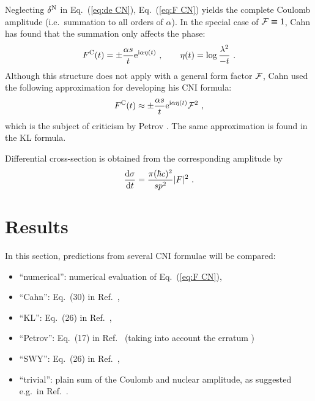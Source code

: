 \documentclass[pdftex,twocolumn,epjc3]{svjour3}
\def\d{{\rm d}}
\def\e{{\rm e}}
\def\I{{\rm i}}
\begin{document}
Neglecting $\delta^{\rm N}$ in Eq.~(\ref{eq:de CN}), Eq.~(\ref{eq:F CN}) yields the complete Coulomb amplitude (i.e.~summation to all orders of $\alpha$). In the special case of ${\cal F} \equiv 1$, Cahn has found that the summation only affects the phase:
\begin{equation}
F^{\rm C}(t) = \pm {\alpha s\over t} \e^{\I\alpha \eta(t)}\ ,\qquad \eta(t) = \log {\lambda^2\over -t}\ .
\label{eq:F C comp}
\end{equation}
Although this structure does not apply with a general form factor ${\cal F}$, Cahn used the following approximation for developing his CNI formula:
\begin{equation}
F^{\rm C}(t) \approx \pm {\alpha s\over t} \e^{\I\alpha \eta(t)} {\cal F}^2  \ ,
\label{eq:F C comp ff}
\end{equation}
which is the subject of criticism by Petrov \cite{petrov2018}. The same approximation is found in the KL formula.

Differential cross-section is obtained from the corresponding amplitude by
\begin{equation}
{\d\sigma\over\d t} = {\pi(\hbar c)^2\over s p^2} |F|^2\ .
\label{eq:cs}
\end{equation}





\section{Results}
\label{sec:results}

In this section, predictions from several CNI formulae will be compared:
\begin{itemize}
\item ``numerical'': numerical evaluation of Eq.~(\ref{eq:F CN}),
\item ``Cahn'': Eq.~(30) in Ref.~\cite{cahn82},
\item ``KL'': Eq.~(26) in Ref.~\cite{kl94},
\item ``Petrov'': Eq.~(17) in Ref.~\cite{petrov2018} (taking into account the erratum \cite{petrov2018-erratum})
\item ``SWY'': Eq.~(26) in Ref.~\cite{wy68},
\item ``trivial'': plain sum of the Coulomb and nuclear amplitude, as suggested e.g.~in Ref.~\cite{godizov2019}.
\end{itemize}
\end{document}
